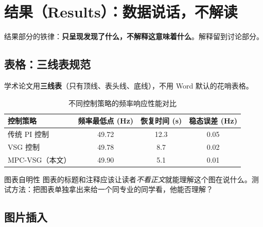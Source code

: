 \documentclass[12pt,a4paper]{ctexart}
\begin{document}
\section{结果（Results）：数据说话，不解读}

结果部分的铁律：\textbf{只呈现发现了什么，不解释这意味着什么}。解释留到讨论部分。

\subsection*{表格：三线表规范}

学术论文用\textbf{三线表}（只有顶线、表头线、底线），不用 Word 默认的花哨表格。

\begin{tcolorbox}[colback=gray!5!white, colframe=gray!50!black, title=三线表示例]
\begin{table}[h]
\centering
\caption{不同控制策略的频率响应性能对比}
\label{tab:comparison}
\begin{tabular}{lccc}
\toprule
\textbf{控制策略} & \textbf{频率最低点 (Hz)} & \textbf{恢复时间 (s)} & \textbf{稳态误差 (Hz)} \\
\midrule
传统 PI 控制    & 49.72 & 12.3 & 0.05 \\
VSG 控制        & 49.78 & 8.7  & 0.02 \\
MPC-VSG（本文）  & 49.90 & 5.1  & 0.01 \\
\bottomrule
\end{tabular}
\end{table}
\end{tcolorbox}

\begin{writingtip}{图表自明性}
    图表的标题和注释应该让读者\emph{不看正文}就能理解这个图在说什么。测试方法：把图表单独拿出来给一个同专业的同学看，他能否理解？
\end{writingtip}

\subsection*{图片插入}

\end{document}

